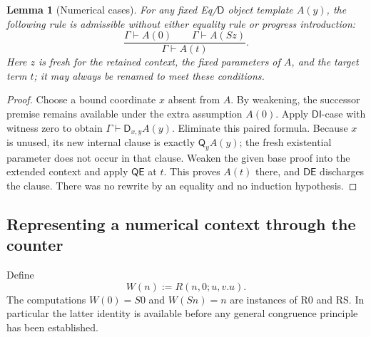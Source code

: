 \documentclass[11pt,letterpaper]{article}
\newtheorem{lemma}[theorem]{Lemma}
\theoremstyle{definition}\newtheorem{definition}[theorem]{Definition}
\theoremstyle{remark}\newtheorem{remark}[theorem]{Remark}
\begin{document}
\begin{lemma}[Numerical cases]
\label{ctr:cases}
For any fixed Eq/$\mathsf D$ object template $A(y)$, the following rule
is admissible without either equality rule or progress introduction:
\[
 \frac{\Gamma\vdash A(0)\qquad\Gamma\vdash A(Sz)}
      {\Gamma\vdash A(t)}.
 \tag{Cases}
\]
Here $z$ is fresh for the retained context, the fixed parameters of
$A$, and the target term $t$; it may always be renamed to meet these
conditions.
\end{lemma}
\begin{proof}
Choose a bound coordinate $x$ absent from $A$. By weakening, the
successor premise remains available under the extra assumption
$A(0)$. Apply $\mathsf{DI}$-case with witness zero to obtain
$\Gamma\vdash\mathsf D_{x,y}A(y)$. Eliminate this paired formula.
Because $x$ is unused, its new internal clause is exactly
$\mathsf Q_yA(y)$; the fresh existential parameter does not occur in
that clause. Weaken the given base proof into the extended context and
apply $\mathsf{QE}$ at $t$. This proves $A(t)$ there, and
$\mathsf{DE}$ discharges the clause. There was no rewrite by an
equality and no induction hypothesis.
\end{proof}

\subsection{Representing a numerical context through the counter}

Define
\[
                  W(n):=R(n,0;u,v.u).
\]
The computations $W(0)=S0$ and $W(Sn)=n$ are instances of R0 and RS.
In particular the latter identity is available before any general
congruence principle has been established.
\end{document}
